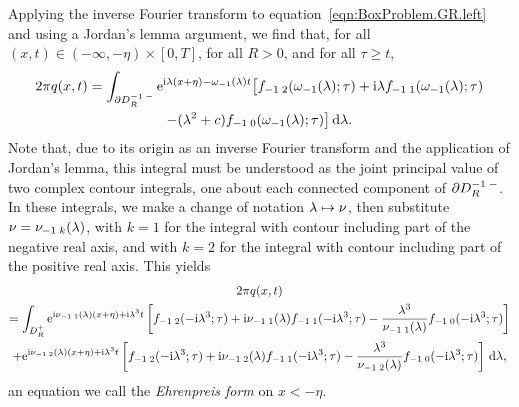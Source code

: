 \documentclass[11pt,reqno,oneside,a4paper]{article}
\begin{document}
Applying the inverse Fourier transform to equation~\eqref{eqn:BoxProblem.GR.left} and using a Jordan's lemma argument, we find that, for all $(x,t)\in(-\infty,-\eta)\times[0,T]$, for all $R>0$, and for all $\tau\geq t$,
\begin{multline}
    2\pi q(x,t) = \int_{\partial D_{R\;}^{-1\;-}} \mathrm{e}^{\mathrm{i}\lambda(x+\eta)-\omega_{-1}(\lambda)t} \big[ f_{-1\;2}(\omega_{-1}(\lambda);\tau) + \mathrm{i}\lambda f_{-1\;1}(\omega_{-1}(\lambda);\tau) \\
    - (\lambda^2+c) f_{-1\;0}(\omega_{-1}(\lambda);\tau) \big] \,\mathrm{d}\lambda.
\end{multline}
Note that, due to its origin as an inverse Fourier transform and the application of Jordan's lemma, this integral must be understood as the joint principal value of two complex contour integrals, one about each connected component of $\partial D_{R\;}^{-1\;-}$.
In these integrals, we make a change of notation $\lambda\mapsto\nu$, then substitute $\nu=\nu_{-1\; k}(\lambda)$, with $k=1$ for the integral with contour including part of the negative real axis, and with $k=2$ for the integral with contour including part of the positive real axis.
This yields
\begin{multline} \label{eqn:BoxProblem.EF.left}
    2\pi q(x,t) \\
    = \int_{D_R^+} \mathrm{e}^{\mathrm{i}\nu_{-1\;1}(\lambda)(x+\eta)+\mathrm{i}\lambda^3t} \left[ f_{-1\;2}(-\mathrm{i}\lambda^3;\tau) + \mathrm{i}\nu_{-1\;1}(\lambda) f_{-1\;1}(-\mathrm{i}\lambda^3;\tau) - \frac{\lambda^3}{\nu_{-1\;1}(\lambda)} f_{-1\;0}(-\mathrm{i}\lambda^3;\tau) \right] \\
    +            \mathrm{e}^{\mathrm{i}\nu_{-1\;2}(\lambda)(x+\eta)+\mathrm{i}\lambda^3t} \left[ f_{-1\;2}(-\mathrm{i}\lambda^3;\tau) + \mathrm{i}\nu_{-1\;2}(\lambda) f_{-1\;1}(-\mathrm{i}\lambda^3;\tau) - \frac{\lambda^3}{\nu_{-1\;2}(\lambda)} f_{-1\;0}(-\mathrm{i}\lambda^3;\tau) \right] \,\mathrm{d}\lambda,
\end{multline}
an equation we call the \emph{Ehrenpreis form} on $x<-\eta$.
\end{document}
